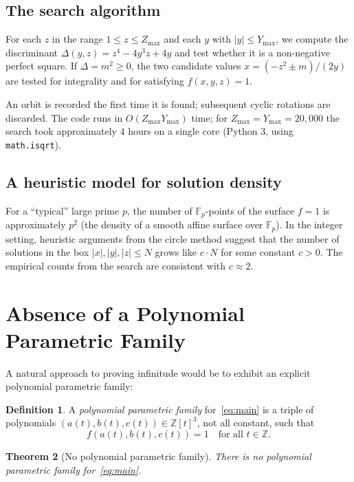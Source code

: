 \documentclass[12pt,a4paper]{article}
\newtheorem{theorem}{Theorem}[section]
\theoremstyle{definition}
\newtheorem{definition}[theorem]{Definition}
\newcommand{\Z}{\mathbb{Z}}
\newcommand{\Fp}{\mathbb{F}}
\newcommand{\abs}[1]{\left|#1\right|}
\begin{document}
\subsection{The search algorithm}

For each $z$ in the range $1 \le z \le Z_{\max}$ and each $y$ with
$\abs{y} \le Y_{\max}$, we compute the discriminant
$\Delta(y,z) = z^4 - 4y^3z + 4y$ and test whether it is a non-negative
perfect square.  If $\Delta = m^2 \ge 0$, the two candidate values
$x = (-z^2 \pm m)/(2y)$ are tested for integrality and for satisfying
$f(x,y,z)=1$.

An orbit is recorded the first time it is found; subsequent cyclic
rotations are discarded.  The code runs in $O(Z_{\max} Y_{\max})$
time; for $Z_{\max}=Y_{\max}=20{,}000$ the search took approximately
$4$ hours on a single core (Python 3, using \texttt{math.isqrt}).

\subsection{A heuristic model for solution density}

For a ``typical'' large prime $p$, the number of $\Fp_p$-points of the
surface $f=1$ is approximately $p^2$ (the density of a smooth affine
surface over $\Fp_p$).  In the integer setting, heuristic arguments
from the circle method suggest that the number of solutions in the
box $\abs{x},\abs{y},\abs{z} \le N$ grows like $c\cdot N$ for some
constant $c > 0$.  The empirical counts from the search are consistent
with $c \approx 2$.

\section{Absence of a Polynomial Parametric Family}\label{sec:noparametric}

A natural approach to proving infinitude would be to exhibit an explicit
polynomial parametric family:

\begin{definition}
  A \emph{polynomial parametric family} for~\eqref{eq:main} is a triple
  of polynomials $(a(t),b(t),c(t))\in\Z[t]^3$, not all constant, such that
  \[
    f(a(t),b(t),c(t)) = 1 \quad\text{for all } t\in\Z.
  \]
\end{definition}

\begin{theorem}[No polynomial parametric family]\label{thm:noparametric}
  There is no polynomial parametric family for~\eqref{eq:main}.
\end{theorem}
\end{document}
